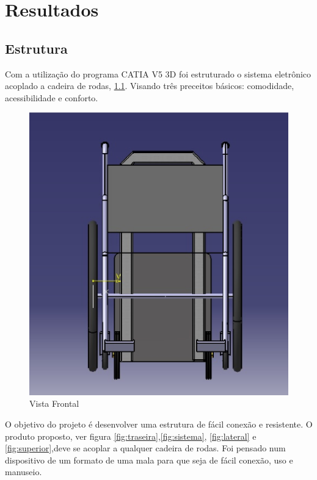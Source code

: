 \chapter[Resultados]{Resultados}

\section{Estrutura}
Com a utilização do programa CATIA V5 3D foi estruturado o sistema eletrônico acoplado a cadeira de rodas, \ref{fig:frontal}. Visando três preceitos básicos: comodidade, acessibilidade e conforto.

\begin{figure}[!htb]
\centering
\includegraphics[keepaspectratio=true,scale=0.4]{figuras/estrutura/vista_frontal}
\caption{Vista Frontal}
\label{fig:frontal}
\end{figure}

O objetivo do projeto é desenvolver uma estrutura de fácil conexão e  resistente. O produto proposto, ver figura \ref{fig:traseira},\ref{fig:sistema}, \ref{fig:lateral} e \ref{fig:superior},deve se acoplar a qualquer cadeira de rodas. Foi pensado num dispositivo de um formato de uma mala para que seja de fácil conexão, uso e manuseio.

